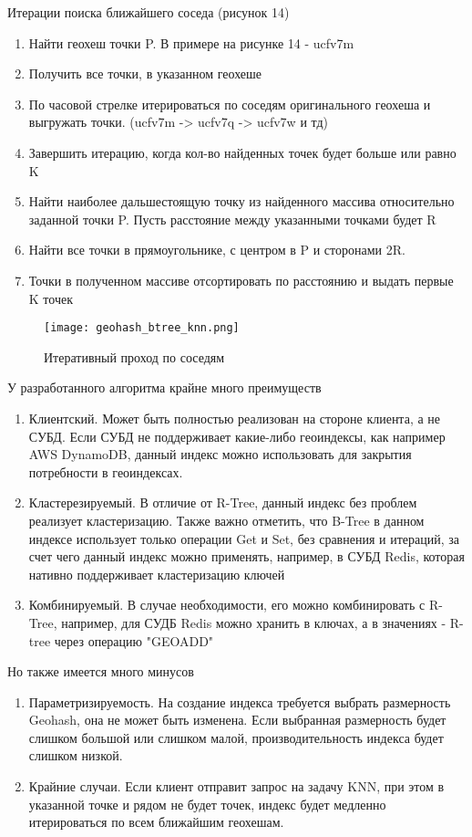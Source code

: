 Итерации поиска ближайшего соседа (рисунок 14)
\begin{enumerate}
    \item Найти геохеш точки P. В примере на рисунке 14 - ucfv7m
    \item Получить все точки, в указанном геохеше
    \item По часовой стрелке итерироваться по соседям оригинального геохеша и выгружать точки. (ucfv7m -> ucfv7q -> ucfv7w и тд)
    \item Завершить итерацию, когда кол-во найденных точек будет больше или равно K
    \item Найти наиболее дальшестоящую точку из найденного массива относительно заданной точки P. Пусть расстояние между указанными точками будет R 
    \item Найти все точки в прямоугольнике, с центром в P и сторонами 2R.
    \item Точки в полученном массиве отсортировать по расстоянию и выдать первые K точек
\end{enumerate}

\begin{figure}[h]
    \centering
    \texttt{[image: geohash\_btree\_knn.png]}
    \caption{Итеративный проход по соседям}
\end{figure}

У разработанного алгоритма крайне много преимуществ
\begin{enumerate}
    \item Клиентский. Может быть полностью реализован на стороне клиента, а не СУБД. Если СУБД не поддерживает какие-либо геоиндексы, как например AWS DynamoDB, данный индекс можно использовать для закрытия потребности в геоиндексах. 
    \item Кластерезируемый. В отличие от R-Tree, данный индекс без проблем реализует кластеризацию. Также важно отметить, что B-Tree в данном индексе использует только операции Get и Set, без сравнения и итераций, за счет чего данный индекс можно применять, например, в СУБД Redis, которая нативно поддерживает кластеризацию ключей 
    \item Комбинируемый. В случае необходимости, его можно комбинировать с R-Tree, например, для СУДБ Redis можно хранить в ключах, а в значениях - R-tree через операцию "GEOADD"
\end{enumerate}
Но также имеется много минусов
\begin{enumerate}
    \item Параметризируемость. На создание индекса требуется выбрать размерность Geohash, она не может быть изменена. Если 
    выбранная размерность будет слишком большой или слишком малой, производительность индекса будет слишком низкой. 
    \item Крайние случаи. Если клиент отправит запрос на задачу KNN, при этом в указанной точке и рядом не будет точек, индекс будет медленно итерироваться по всем ближайшим геохешам.
\end{enumerate}